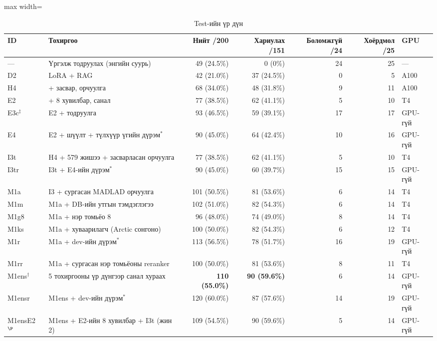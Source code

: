 \begin{table}[H]
\centering\small
\caption{Test-ийн үр дүн}
\label{tab:test}
\begin{adjustbox}{max width=\textwidth}
\begin{tabular}{llrrrrl}
\toprule
ID & Тохиргоо & Нийт /200 & Хариулах /151 & Боломжгүй /24 & Хоёрдмол /25 & GPU \\
\midrule
--- & Үргэлж тодруулах (энгийн суурь) & 49 (24.5\%) & 0 (0\%) & 24 & 25 & --- \\
\midrule
D2 & LoRA + RAG & 42 (21.0\%) & 37 (24.5\%) & 0 & 5 & A100 \\
H4 & + засвар, орчуулга & 68 (34.0\%) & 48 (31.8\%) & 9 & 11 & A100 \\
E2 & + 8 хувилбар, санал & 77 (38.5\%) & 62 (41.1\%) & 5 & 10 & T4 \\
E3c$^\ddagger$ & E2 + тодруулга & 93 (46.5\%) & 59 (39.1\%) & 17 & 17 & GPU-гүй \\
E4 & E2 + шүүлт + түлхүүр үгийн дүрэм$^\ast$ & 90 (45.0\%) & 64 (42.4\%) & 10 & 16 & GPU-гүй \\
I3t & H4 + 579 жишээ + засварласан орчуулга & 77 (38.5\%) & 62 (41.1\%) & 5 & 10 & T4 \\
I3tr & I3t + E4-ийн дүрэм$^\ast$ & 90 (45.0\%) & 60 (39.7\%) & 15 & 15 & GPU-гүй \\
M1a & I3 + сургасан MADLAD орчуулга & 101 (50.5\%) & 81 (53.6\%) & 6 & 14 & T4 \\
M1m & M1a + DB-ийн утгын тэмдэглэгээ & 102 (51.0\%) & 82 (54.3\%) & 6 & 14 & T4 \\
M1g8 & M1a + нэр томьёо 8 & 96 (48.0\%) & 74 (49.0\%) & 8 & 14 & T4 \\
M1ks & M1a + хуваарилагч (Arctic сонгоно) & 100 (50.0\%) & 82 (54.3\%) & 6 & 12 & T4 \\
M1r & M1a + dev-ийн дүрэм$^\ast$ & 113 (56.5\%) & 78 (51.7\%) & 16 & 19 & GPU-гүй \\
M1rr & M1a + сургасан нэр томьёоны reranker & 100 (50.0\%) & 81 (53.6\%) & 8 & 11 & T4 \\
\midrule
M1ens$^\dagger$ & 5 тохиргооны үр дүнгээр санал хураах & \textbf{110 (55.0\%)} & \textbf{90 (59.6\%)} & 6 & 14 & GPU-гүй \\
M1ensr & M1ens + dev-ийн дүрэм$^\ast$ & 120 (60.0\%) & 87 (57.6\%) & 14 & 19 & GPU-гүй \\
\midrule
M1ensE2$^\P$ & M1ens + E2-ийн 8 хувилбар + I3t (жин 2) & 109 (54.5\%) & 90 (59.6\%) & 5 & 14 & GPU-гүй \\
\bottomrule
\end{tabular}

\end{adjustbox}
\end{table}
